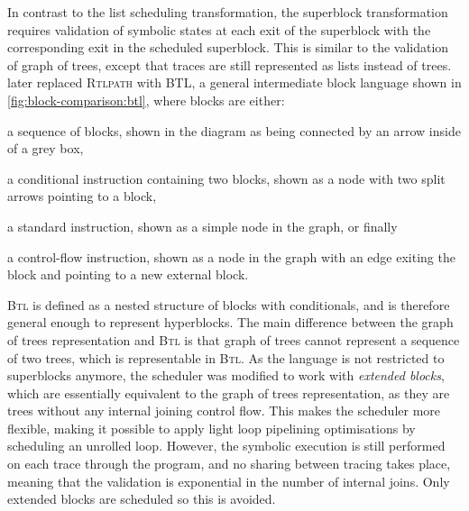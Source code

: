 In contrast to the list scheduling transformation, the superblock transformation
requires validation of symbolic states at each exit of the superblock with the
corresponding exit in the scheduled \gls{superblock}.  This is similar to the
validation of graph of trees, except that traces are still represented as lists
instead of trees.  \textcite[]{gourdin23_fvobs} later replaced \textsc{Rtlpath}
with \gls{BTL}, a general intermediate block language shown in
\cref{fig:block-comparison:btl}, where blocks are either:
\begin{enumerate*}[label=(\arabic*)]
\item a sequence of blocks, shown in the diagram as being connected by an arrow
  inside of a grey box,
\item a conditional instruction containing two blocks, shown as a node with two
  split arrows pointing to a block,
\item a standard instruction, shown as a simple node in the graph, or finally
\item a control-flow instruction, shown as a node in the graph with an edge
  exiting the block and pointing to a new external block.
\end{enumerate*}
\textsc{Btl} is defined as a nested structure of blocks with conditionals, and
is therefore general enough to represent \glspl{hyperblock}.  The main
difference between the graph of trees representation and \textsc{Btl} is that
graph of trees cannot represent a sequence of two trees, which is representable
in \textsc{Btl}.  As the language is not restricted to superblocks anymore, the
scheduler was modified to work with \emph{extended blocks}, which are
essentially equivalent to the graph of trees representation, as they are trees
without any internal joining \gls{control flow}.  This makes the scheduler more
flexible, making it possible to apply light loop pipelining optimisations by
scheduling an unrolled loop.  However, the symbolic execution is still performed
on each trace through the program, and no sharing between tracing takes place,
meaning that the validation is exponential in the number of internal joins.
Only extended blocks are scheduled so this is avoided.


